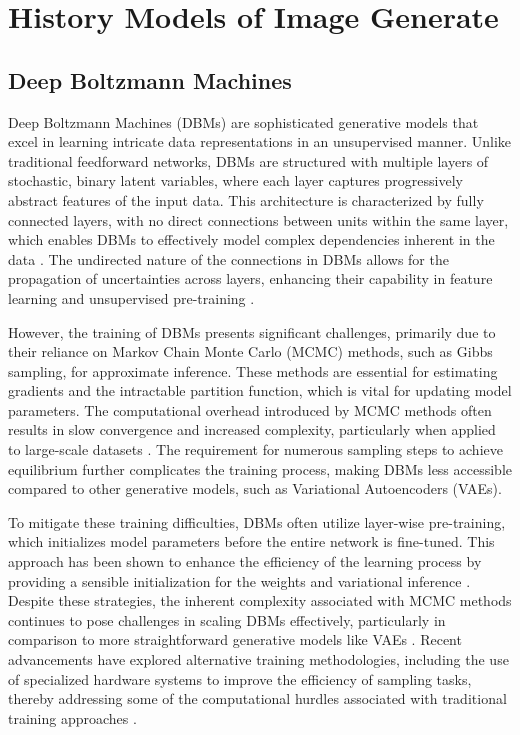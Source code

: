 \chapter{History Models of Image Generate}
\label{Related Work}

\section{Deep Boltzmann Machines}

Deep Boltzmann Machines (DBMs) are sophisticated generative models that excel in learning intricate data representations 
in an unsupervised manner. Unlike traditional feedforward networks, DBMs are structured with multiple layers of stochastic, 
binary latent variables, where each layer captures progressively abstract features of the input data. This architecture is 
characterized by fully connected layers, with no direct connections between units within the same layer, which enables DBMs 
to effectively model complex dependencies inherent in the data \citep{10.1007/978-3-642-40728-4_14}. The undirected nature 
of the connections in DBMs allows for the propagation of uncertainties across layers, enhancing their capability in feature 
learning and unsupervised pre-training \citep{10.1007/978-3-642-40728-4_14}\citep{10.48550/arxiv.1203.3783}.

However, the training of DBMs presents significant challenges, primarily due to their reliance on Markov Chain Monte Carlo (MCMC) methods, 
such as Gibbs sampling, for approximate inference. These methods are essential for estimating gradients and the intractable partition 
function, which is vital for updating model parameters. The computational overhead introduced by MCMC methods often results in 
slow convergence and increased complexity, particularly when applied to large-scale datasets \citep{10.48550/arxiv.2303.10728}. 
The requirement for numerous sampling steps to achieve equilibrium further complicates the training process, making DBMs less 
accessible compared to other generative models, such as Variational Autoencoders (VAEs).

To mitigate these training difficulties, DBMs often utilize layer-wise pre-training, which initializes model parameters 
before the entire network is fine-tuned. This approach has been shown to enhance the efficiency of the learning process
by providing a sensible initialization for the weights and variational inference \citep{10.1162/neco_a_00311}. Despite 
these strategies, the inherent complexity associated with MCMC methods continues to pose challenges in scaling DBMs 
effectively, particularly in comparison to more straightforward generative models like VAEs \citep{10.48550/arxiv.2303.10728}. 
Recent advancements have explored alternative training methodologies, including the use of specialized hardware systems to improve 
the efficiency of sampling tasks, thereby addressing some of the computational hurdles associated with traditional training approaches \citep{10.48550/arxiv.2303.10728}.




